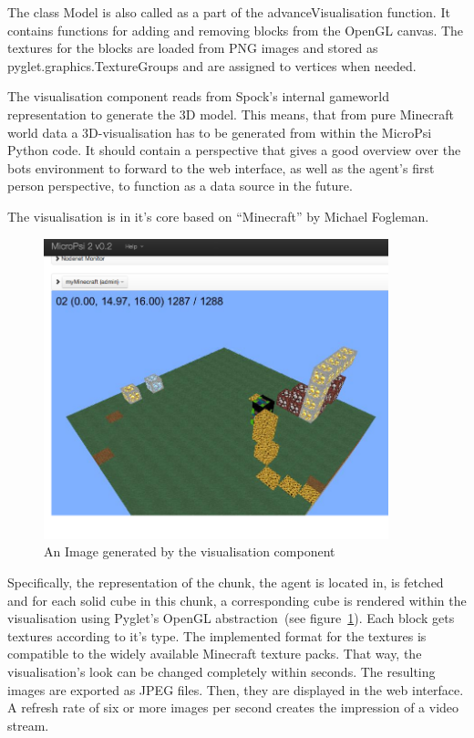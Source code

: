 The class Model is also called as a part of the advanceVisualisation function. It contains functions for adding and removing blocks from the OpenGL canvas. The textures for the blocks are loaded from PNG images and stored as pyglet.graphics.TextureGroups and are assigned to vertices when needed.

The visualisation component reads from Spock's internal gameworld representation to generate the 3D model. This means, that from pure Minecraft world data a 3D-visualisation has to be generated from within the MicroPsi Python code. It should contain a perspective that gives a good overview over the bots environment to forward to the web interface, as well as the agent's first person perspective, to function as a data source in the future.  

The visualisation is in it's core based on ``Minecraft'' by Michael Fogleman.

\begin{figure}[h]
  \centering
    \includegraphics[width=10cm]{graphics/visualisation_screen}
  \caption{An Image generated by the visualisation component}
  \label{vis_screen}
\end{figure}

Specifically, the representation of the chunk, the agent is located in, is fetched and for each solid cube in this chunk, a corresponding cube is rendered within the visualisation using Pyglet's OpenGL abstraction~(see figure~\ref{vis_screen}). Each block gets textures according to it's type. The implemented format for the textures is compatible to the widely available Minecraft texture packs. That way, the visualisation's look can be changed completely within seconds. The resulting images are exported as JPEG files. Then, they are displayed in the web interface. A refresh rate of six or more images per second creates the impression of a video stream.

